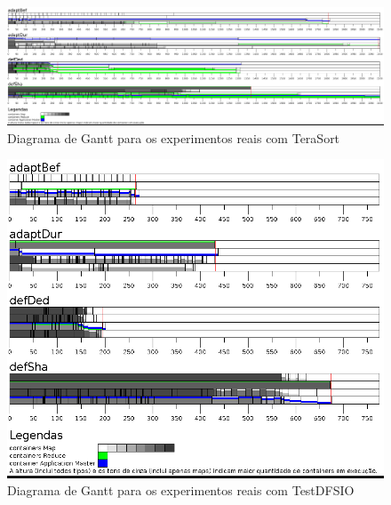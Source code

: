 \clearpage
\begin{figure}
	\centering
	\includegraphics[width=1\textwidth]{figuras/TS-real.png}
	\caption{Diagrama de Gantt para os experimentos reais com TeraSort}
	\label{fig:exp2TS}
\end{figure}
\clearpage

\begin{figure}[!ht]
	\centering
	\includegraphics[width=\textwidth]{figuras/DFS-real.png}
	\caption{Diagrama de Gantt para os experimentos reais com TestDFSIO}
	\label{fig:exp2IO}
\end{figure}

